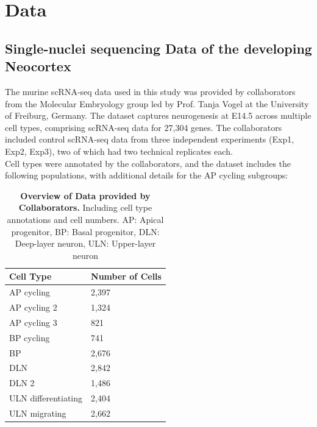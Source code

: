 \chapter{Data}
\label{chap:data}

\section{Single-nuclei sequencing Data of the developing Neocortex}
The murine scRNA-seq data used in this study was provided by collaborators from the Molecular Embryology group led by Prof. Tanja Vogel at the University of Freiburg, Germany. The dataset captures neurogenesis at E14.5 across multiple cell types, comprising scRNA-seq data for 27,304 genes. The collaborators included control scRNA-seq data from three independent experiments (Exp1, Exp2, Exp3), two of which had two technical replicates each. 
\\

Cell types were annotated by the collaborators, and the dataset includes the following populations, with additional details for the AP cycling subgroups: 

\begin{table}[h]
    \centering
    \caption{\textbf{Overview of Data provided by Collaborators.} Including cell type annotations 
        and cell numbers. AP: Apical progenitor, BP: Basal progenitor, DLN: Deep-layer neuron, ULN: Upper-layer neuron\\
    }
    \label{tab:data}
    \begin{tabular}{ll}
        \textbf{Cell Type}                       & \textbf{Number of Cells} \\ \hline
        \multicolumn{1}{l|}{AP cycling}          & 2,397                    \\
        \multicolumn{1}{l|}{AP cycling 2}        & 1,324                    \\
        \multicolumn{1}{l|}{AP cycling 3}        & 821                      \\
        \multicolumn{1}{l|}{BP cycling}          & 741                      \\
        \multicolumn{1}{l|}{BP}                  & 2,676                    \\
        \multicolumn{1}{l|}{DLN}                 & 2,842                    \\
        \multicolumn{1}{l|}{DLN 2}               & 1,486                    \\
        \multicolumn{1}{l|}{ULN differentiating} & 2,404                    \\
        \multicolumn{1}{l|}{ULN migrating}       & 2,662                   
    \end{tabular}
\end{table}

